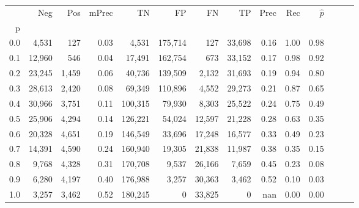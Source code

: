 \begin{tabular}{rrrrrrrrrrrrrr}
\toprule
{} &     Neg &    Pos & mPrec &       TN &       FP &      FN &      TP &  Prec &   Rec & $\hat{p}$ \\
p   &         &        &       &          &          &         &         &       &       &           \\
\midrule
0.0 &   4,531 &    127 &  0.03 &    4,531 &  175,714 &     127 &  33,698 &  0.16 &  1.00 &      0.98 \\
0.1 &  12,960 &    546 &  0.04 &   17,491 &  162,754 &     673 &  33,152 &  0.17 &  0.98 &      0.92 \\
0.2 &  23,245 &  1,459 &  0.06 &   40,736 &  139,509 &   2,132 &  31,693 &  0.19 &  0.94 &      0.80 \\
0.3 &  28,613 &  2,420 &  0.08 &   69,349 &  110,896 &   4,552 &  29,273 &  0.21 &  0.87 &      0.65 \\
0.4 &  30,966 &  3,751 &  0.11 &  100,315 &   79,930 &   8,303 &  25,522 &  0.24 &  0.75 &      0.49 \\
0.5 &  25,906 &  4,294 &  0.14 &  126,221 &   54,024 &  12,597 &  21,228 &  0.28 &  0.63 &      0.35 \\
0.6 &  20,328 &  4,651 &  0.19 &  146,549 &   33,696 &  17,248 &  16,577 &  0.33 &  0.49 &      0.23 \\
0.7 &  14,391 &  4,590 &  0.24 &  160,940 &   19,305 &  21,838 &  11,987 &  0.38 &  0.35 &      0.15 \\
0.8 &   9,768 &  4,328 &  0.31 &  170,708 &    9,537 &  26,166 &   7,659 &  0.45 &  0.23 &      0.08 \\
0.9 &   6,280 &  4,197 &  0.40 &  176,988 &    3,257 &  30,363 &   3,462 &  0.52 &  0.10 &      0.03 \\
1.0 &   3,257 &  3,462 &  0.52 &  180,245 &        0 &  33,825 &       0 &   nan &  0.00 &      0.00 \\
\bottomrule
\end{tabular}
